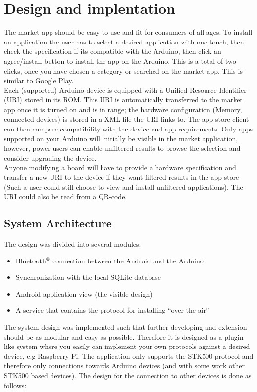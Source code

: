\chapter{Design and implentation}
The market app should be easy to use and fit for consumers of all ages. To install an application the user has to select a desired application with one touch, then check the specification if its compatible with the Arduino, then click an agree/install button to install the app on the Arduino. This is a total of two clicks, once you have chosen a category or searched on the market app. This is similar to Google Play.\\
\newline
Each (supported) Arduino device is equipped with a Unified Resource Identifier (URI) stored in its ROM. This URI is automatically transferred to the market app once it is turned on and is in range; the hardware configuration (Memory, connected devices) is stored in a XML file the URI links to.
The app store client can then compare compatibility with the device and app requirements.
Only apps supported on your Arduino will initially be visible in the market application, however, power users can enable unfiltered results to browse the selection and consider upgrading the device.\\
\newline
Anyone modifying a board will have to provide a hardware specification and transfer a new URI to the device if they want filtered results in the app store (Such a user could still choose to view and install unfiltered applications).
The URI could also be read from a QR-code.

\section{System Architecture}
	The design was divided into several modules:
	\begin{itemize}
		\item{Bluetooth$\textsuperscript{\textregistered}$ connection between the Android and the Arduino}
		\item{Synchronization with the local SQLite database}
		\item{Android application view (the visible design)}
		\item{A service that contains the protocol for installing ``over the air''}
	\end{itemize}
	\vspace{0.2in}
	
	The system design was implemented such that further developing and extension should be as modular and easy as possible.
	Therefore it is designed as a plugin-like system where you easily can implement your own protocols against a desired device, e.g Raspberry Pi. The application only supports the STK500 protocol and therefore only connections towards Arduino devices (and with some work other STK500 based devices).
	The design for the connection to other devices is done as follows:\\


